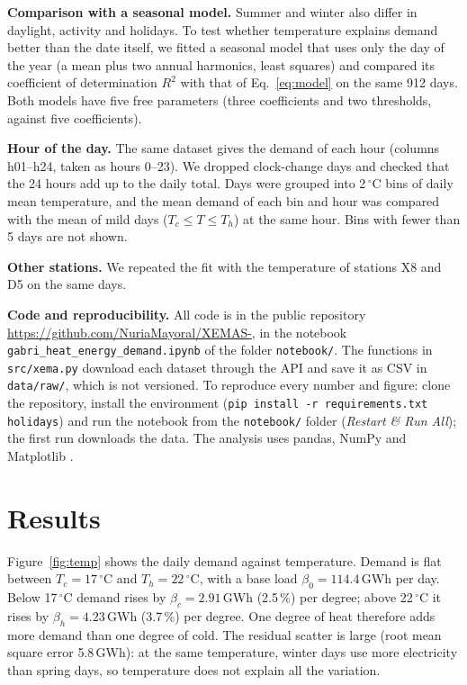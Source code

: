 \documentclass[
  journal=small,
  manuscript=mini-article,  %
  year=2026,
  volume=1,
]{odj-journal}
\begin{document}
\textbf{Comparison with a seasonal model.} Summer and winter also differ in daylight, activity and holidays. To test whether temperature explains demand better than the date itself, we fitted a seasonal model that uses only the day of the year (a mean plus two annual harmonics, least squares) and compared its coefficient of determination $R^2$ with that of Eq.~\eqref{eq:model} on the same 912 days. Both models have five free parameters (three coefficients and two thresholds, against five coefficients).

\textbf{Hour of the day.} The same dataset gives the demand of each hour (columns h01--h24, taken as hours 0--23). We dropped clock-change days and checked that the 24 hours add up to the daily total. Days were grouped into 2\,$^\circ$C bins of daily mean temperature, and the mean demand of each bin and hour was compared with the mean of mild days ($T_c \le T \le T_h$) at the same hour. Bins with fewer than 5 days are not shown.

\textbf{Other stations.} We repeated the fit with the temperature of stations X8 and D5 on the same days.

\textbf{Code and reproducibility.} All code is in the public repository \url{https://github.com/NuriaMayoral/XEMAS-}, in the notebook \texttt{gabri\_heat\_energy\_demand.ipynb} of the folder \texttt{notebook/}. The functions in \texttt{src/xema.py} download each dataset through the API and save it as CSV in \texttt{data/raw/}, which is not versioned. To reproduce every number and figure: clone the repository, install the environment (\texttt{pip install -r requirements.txt holidays}) and run the notebook from the \texttt{notebook/} folder (\emph{Restart \& Run All}); the first run downloads the data. The analysis uses pandas, NumPy and Matplotlib \cite{pandas,numpy,matplotlib}.

\section{Results}

Figure~\ref{fig:temp} shows the daily demand against temperature. Demand is flat between $T_c = 17$\,$^\circ$C and $T_h = 22$\,$^\circ$C, with a base load $\beta_0 = 114.4$\,GWh per day. Below 17\,$^\circ$C demand rises by $\beta_c = 2.91$\,GWh (2.5\,\%) per degree; above 22\,$^\circ$C it rises by $\beta_h = 4.23$\,GWh (3.7\,\%) per degree. One degree of heat therefore adds more demand than one degree of cold. The residual scatter is large (root mean square error 5.8\,GWh): at the same temperature, winter days use more electricity than spring days, so temperature does not explain all the variation.
\end{document}
